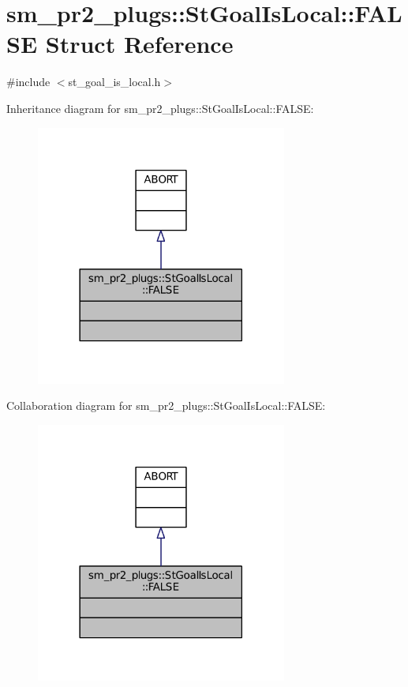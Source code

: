 \hypertarget{structsm__pr2__plugs_1_1StGoalIsLocal_1_1FALSE}{}\section{sm\+\_\+pr2\+\_\+plugs\+:\+:St\+Goal\+Is\+Local\+:\+:F\+A\+L\+SE Struct Reference}
\label{structsm__pr2__plugs_1_1StGoalIsLocal_1_1FALSE}


{\ttfamily \#include $<$st\+\_\+goal\+\_\+is\+\_\+local.\+h$>$}



Inheritance diagram for sm\+\_\+pr2\+\_\+plugs\+:\+:St\+Goal\+Is\+Local\+:\+:F\+A\+L\+SE\+:
\nopagebreak
\begin{figure}[H]
\begin{center}
\leavevmode
\includegraphics[width=234pt]{structsm__pr2__plugs_1_1StGoalIsLocal_1_1FALSE__inherit__graph}
\end{center}
\end{figure}


Collaboration diagram for sm\+\_\+pr2\+\_\+plugs\+:\+:St\+Goal\+Is\+Local\+:\+:F\+A\+L\+SE\+:
\nopagebreak
\begin{figure}[H]
\begin{center}
\leavevmode
\includegraphics[width=234pt]{structsm__pr2__plugs_1_1StGoalIsLocal_1_1FALSE__coll__graph}
\end{center}
\end{figure}


